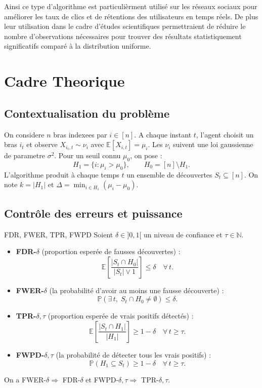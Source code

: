\documentclass[11pt,a4paper]{article}
\newcommand{\E}{\mathbb{E}}
\newcommand{\Prob}{\mathbb{P}}
\newcommand{\sigsq}{\sigma^2}
\newcommand{\Hnull}{H_0}
\newcommand{\Halt}{H_1}
\begin{document}
Ainsi ce type d'algorithme est particulièrment utilisé sur les réseaux sociaux pour améliorer les taux de clics et de rétentions des utilisateurs en temps réels. De plus leur utilisation dans le cadre d'études scientifiques permettraient de réduire le nombre d'observations nécessaires pour trouver des résultats statistiquement significatifs comparé à la distribution uniforme.



\section{Cadre Theorique}
\label{sec:cadre}

\subsection{Contextualisation du problème}

On considere $n$ bras indexees par $i \in [n]$. A chaque instant
$t$, l'agent choisit un bras $i_t$ et observe $X_{i_t,t} \sim \nu_i$
avec $\E[X_{i,t}] = \mu_i$. Les $\nu_i$ suivent une loi gaussienne de parametre $\sigsq$. Pour un seuil connu
$\mu_0$, on pose :
\[
  \Halt = \{i : \mu_i > \mu_0\}, \qquad \Hnull = [n] \setminus \Halt.
\]
L'algorithme produit à chaque temps $t$ un ensemble de découvertes
$S_t \subseteq [n]$. On note $k = |\Halt|$ et
$\Delta = \min_{i \in \Halt}(\mu_i - \mu_0)$.

\subsection{Contr\^ole des erreurs et puissance}

\begin{definition}{FDR, FWER, TPR, FWPD}{}
Soient $\delta \in ]0,1[$ un niveau de confiance et $\tau \in \mathbb{N}$.
\begin{itemize}
  \item \textbf{FDR-$\delta$} (proportion esperée de fausses découvertes) :
  \[
    \E\!\left[\frac{|S_t \cap \Hnull|}{|S_t|\vee 1}\right] \leq \delta
    \quad \forall\, t.
  \]
  \item \textbf{FWER-$\delta$} (la probabilité d'avoir au moins une fausse découverte) :
  \[
    \Prob\!\left(\exists\, t,\; S_t \cap \Hnull \neq \emptyset\right)
    \leq \delta.
  \]
  \item \textbf{TPR-$\delta{,}\tau$} (proportion esperée de vrais positifs détectés) :
  \[
    \E\!\left[\frac{|S_t \cap \Halt|}{|\Halt|}\right] \geq 1-\delta
    \quad \forall\, t \geq \tau.
  \]
  \item \textbf{FWPD-$\delta{,}\tau$} (la probabilité de détecter tous les vrais
  positifs) :
  \[
    \Prob(\Halt \subseteq S_t) \geq 1-\delta \quad \forall\, t \geq \tau.
  \]
\end{itemize}
On a FWER-$\delta \Rightarrow$ FDR-$\delta$ et
FWPD-$\delta{,}\tau \Rightarrow$ TPR-$\delta{,}\tau$.
\end{definition}
\end{document}
